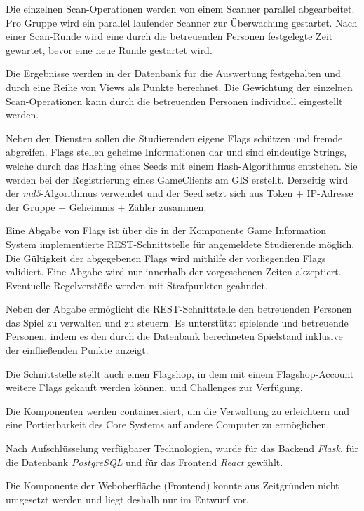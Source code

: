Die einzelnen Scan-Operationen werden von einem Scanner parallel abgearbeitet. Pro Gruppe wird ein parallel laufender Scanner zur Überwachung gestartet. Nach einer Scan-Runde wird eine durch die betreuenden Personen festgelegte Zeit gewartet, bevor eine neue Runde gestartet wird.

Die Ergebnisse werden in der Datenbank für die Auswertung festgehalten und durch eine Reihe von Views als Punkte berechnet. Die Gewichtung der einzelnen Scan-Operationen kann durch die betreuenden Personen individuell eingestellt werden.

Neben den Diensten sollen die Studierenden eigene Flags schützen und fremde abgreifen.
Flags stellen geheime Informationen dar und sind eindeutige Strings, welche durch das Hashing eines Seeds mit einem Hash-Algorithmus entstehen. Sie werden bei der Registrierung eines GameClients am GIS erstellt.
Derzeitig wird der \textit{md5}-Algorithmus verwendet und der Seed setzt sich aus Token + IP-Adresse der Gruppe + Geheimnis + Zähler zusammen.

Eine Abgabe von Flags ist über die in der Komponente Game Information System implementierte REST-Schnittstelle für angemeldete Studierende möglich. Die Gültigkeit der abgegebenen Flags wird mithilfe der vorliegenden Flags validiert. Eine Abgabe wird nur innerhalb der vorgesehenen Zeiten akzeptiert. Eventuelle Regelverstöße werden mit Strafpunkten geahndet.

Neben der Abgabe ermöglicht die REST-Schnittstelle den betreuenden Personen das Spiel zu verwalten und zu steuern. Es unterstützt spielende und betreuende Personen, indem es den durch die Datenbank berechneten Spielstand inklusive der einfließenden Punkte anzeigt.

Die Schnittstelle stellt auch einen Flagshop, in dem mit einem Flagshop-Account weitere Flags gekauft werden können, und Challenges zur Verfügung.

Die Komponenten werden containerisiert, um die Verwaltung zu erleichtern und eine Portierbarkeit des Core Systems auf andere Computer zu ermöglichen.

Nach Aufschlüsselung verfügbarer Technologien, wurde für das Backend \textit{Flask}, für die Datenbank \textit{PostgreSQL} und für das Frontend \textit{React} gewählt.

Die Komponente der Weboberfläche (Frontend) konnte aus Zeitgründen nicht umgesetzt werden und liegt deshalb nur im Entwurf vor.




